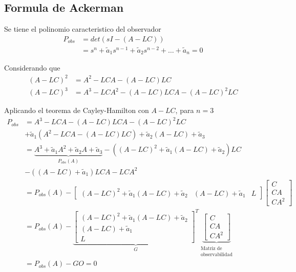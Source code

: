 \subsection{Formula de Ackerman}

Se tiene el polinomio caracteristico del observador 
\[
    \begin{split}
        P_{obs} & = det(sI-(A-LC)) \\
        & = s^{n} + \tilde{a}_{1}s^{n-1} + \tilde{a}_{2}s^{n-2} + \ldots + \tilde{a}_{n} = 0
    \end{split}
\]

Considerando que 
\[
    \begin{split}
        (A-LC)^{2} & = A^{2} - LCA - (A-LC)LC \\
        (A-LC)^{3} & = A^{3} - LCA^{2} - (A-LC)LCA - (A-LC)^{2}LC 
    \end{split}
\]

Aplicando el teorema de Cayley-Hamilton con \( A-LC \), para \( n=3 \)
\[
    \begin{split}
        P_{obs} & = A^{3} -LCA - (A-LC)LCA - (A-LC)^{2}LC \\
        & + \tilde{a}_{1}(A^{2}-LCA- (A-LC)LC) + \tilde{a}_{2}(A-LC) + \tilde{a}_{3} \\
        & = \underbrace{A^{3} + \tilde{a}_{1}A^{2} + \tilde{a}_{2}A + \tilde{a}_{3}}_{P_{obs}(A)} - ((A-LC)^{2} + \tilde{a}_{1}(A-LC) + \tilde{a}_{2})LC \\
        &- ((A-LC) + \tilde{a}_{1})LCA -LCA^{2}\\
        & = P_{obs}(A) - 
        \begin{bmatrix}
            (A-LC)^{2} + \tilde{a}_{1}(A-LC) + \tilde{a}_{2} &
            (A-LC) + \tilde{a}_{1} &
            L
        \end{bmatrix}
        \begin{bmatrix}
            C \\ CA \\ CA^{2}
        \end{bmatrix} \\
        & = P_{obs}(A) -
        \underbrace{
        \begin{bmatrix}
            (A-LC)^{2} + \tilde{a}_{1}(A-LC) + \tilde{a}_{2} \\
            (A-LC) + \tilde{a}_{1} \\
            L
        \end{bmatrix}^{T}}_{G}
        \underbrace{
        \begin{bmatrix}
            C \\ CA \\ CA^{2}
        \end{bmatrix}}_{
        \begin{matrix}
            \text{Matriz de} \\
            \text{observabilidad}
        \end{matrix}
        } \\
        & = P_{obs}(A) -GO = 0
    \end{split}
\]

